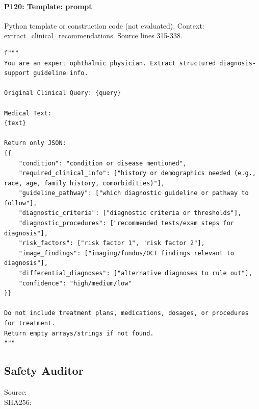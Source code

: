 \documentclass[10pt]{article}
\begin{document}
\paragraph{P120: Template: prompt}
Python template or construction code (not evaluated). Context: extract\_clinical\_recommendations. Source lines 315-338.
\begin{Verbatim}
f"""
You are an expert ophthalmic physician. Extract structured diagnosis-support guideline info.

Original Clinical Query: {query}

Medical Text:
{text}

Return only JSON:
{{
    "condition": "condition or disease mentioned",
    "required_clinical_info": ["history or demographics needed (e.g., race, age, family history, comorbidities)"],
    "guideline_pathway": ["which diagnostic guideline or pathway to follow"],
    "diagnostic_criteria": ["diagnostic criteria or thresholds"],
    "diagnostic_procedures": ["recommended tests/exam steps for diagnosis"],
    "risk_factors": ["risk factor 1", "risk factor 2"],
    "image_findings": ["imaging/fundus/OCT findings relevant to diagnosis"],
    "differential_diagnoses": ["alternative diagnoses to rule out"],
    "confidence": "high/medium/low"
}}

Do not include treatment plans, medications, dosages, or procedures for treatment.
Return empty arrays/strings if not found.
"""
\end{Verbatim}
\subsection{Safety Auditor}
Source: \\
SHA256: {\scriptsize{}}
\end{document}
